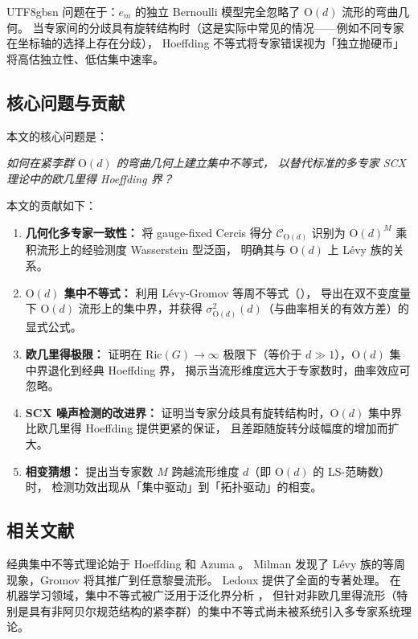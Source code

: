 \documentclass[12pt,a4paper]{article}
\theoremstyle{plain}
\theoremstyle{definition}
\theoremstyle{remark}
\newcommand{\Od}{\mathrm{O}(d)}
\newcommand{\cercis}{\mathcal{C}}
\begin{document}
\begin{CJK}{UTF8}{gbsn}
问题在于：$e_m$ 的独立 Bernoulli 模型完全忽略了 $\Od$ 流形的弯曲几何。
当专家间的分歧具有旋转结构时（这是实际中常见的情况——例如不同专家在坐标轴的选择上存在分歧），
Hoeffding 不等式将专家错误视为「独立抛硬币」将高估独立性、低估集中速率。

\subsection{核心问题与贡献}

本文的核心问题是：

\begin{center}
\itshape
如何在紧李群 $\Od$ 的弯曲几何上建立集中不等式，
以替代标准的多专家 SCX 理论中的欧几里得 Hoeffding 界？
\end{center}

本文的贡献如下：

\begin{enumerate}[label=(C\arabic*), leftmargin=*]
    \item \textbf{几何化多专家一致性：}
    将 gauge-fixed Cercis 得分 $\cercis_{\Od}$ 识别为 $\Od^{M}$ 乘积流形上的经验测度 Wasserstein 型泛函，
    明确其与 $\Od$ 上 Lévy 族的关系。

    \item \textbf{$\Od$ 集中不等式：}
    利用 Lévy-Gromov 等周不等式（\cite{gromov1980, ledoux2001}），
    导出在双不变度量下 $\Od$ 流形上的集中界，并获得 $\sigma^2_{\Od}(d)$（与曲率相关的有效方差）的显式公式。

    \item \textbf{欧几里得极限：}
    证明在 Ric$(G) \to \infty$ 极限下（等价于 $d \gg 1$），$\Od$ 集中界退化到经典 Hoeffding 界，
    揭示当流形维度远大于专家数时，曲率效应可忽略。

    \item \textbf{SCX 噪声检测的改进界：}
    证明当专家分歧具有旋转结构时，$\Od$ 集中界比欧几里得 Hoeffding 提供更紧的保证，
    且差距随旋转分歧幅度的增加而扩大。

    \item \textbf{相变猜想：}
    提出当专家数 $M$ 跨越流形维度 $d$（即 $\Od$ 的 LS-范畴数）时，
    检测功效出现从「集中驱动」到「拓扑驱动」的相变。
\end{enumerate}

\subsection{相关文献}

经典集中不等式理论始于 Hoeffding \cite{hoeffding1963} 和 Azuma \cite{azuma1967}。
Milman \cite{milman1971} 发现了 Lévy 族的等周现象，Gromov \cite{gromov1980} 将其推广到任意黎曼流形。
Ledoux \cite{ledoux2001} 提供了全面的专著处理。
在机器学习领域，集中不等式被广泛用于泛化界分析 \cite{boucheron2005}，
但针对非欧几里得流形（特别是具有非阿贝尔规范结构的紧李群）的集中不等式尚未被系统引入多专家系统理论。


\end{CJK}
\end{document}
